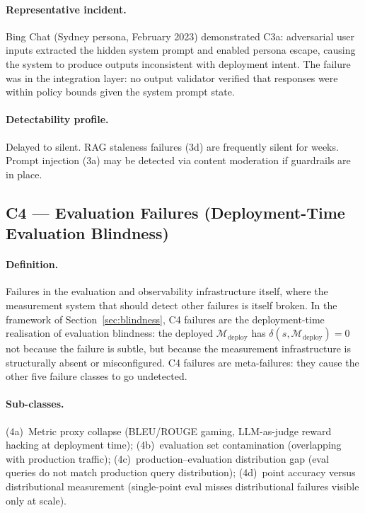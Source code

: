 \documentclass{article}
\begin{document}
\paragraph{Representative incident.}
Bing Chat (Sydney persona, February 2023) demonstrated C3a: adversarial user
inputs extracted the hidden system prompt and enabled persona escape, causing
the system to produce outputs inconsistent with deployment intent.  The failure
was in the integration layer: no output validator verified that responses were
within policy bounds given the system prompt state.

\paragraph{Detectability profile.}
Delayed to silent.  RAG staleness failures (3d) are frequently silent for
weeks.  Prompt injection (3a) may be detected via content moderation if
guardrails are in place.

\subsection{C4 --- Evaluation Failures (Deployment-Time Evaluation Blindness)}

\paragraph{Definition.}
Failures in the evaluation and observability infrastructure itself, where
the measurement system that should detect other failures is itself broken.
In the framework of Section~\ref{sec:blindness}, C4 failures are the
deployment-time realisation of evaluation blindness: the deployed
$\mathcal{M}_{\text{deploy}}$ has $\delta(s, \mathcal{M}_{\text{deploy}}) = 0$
not because the failure is subtle, but because the measurement infrastructure
is structurally absent or misconfigured.  C4 failures are meta-failures:
they cause the other five failure classes to go undetected.

\paragraph{Sub-classes.}
(4a)~Metric proxy collapse (BLEU/ROUGE gaming, LLM-as-judge reward hacking at
deployment time); (4b)~evaluation set contamination (overlapping with production
traffic); (4c)~production--evaluation distribution gap (eval queries do not
match production query distribution); (4d)~point accuracy versus distributional
measurement (single-point eval misses distributional failures visible only
at scale).
\end{document}
